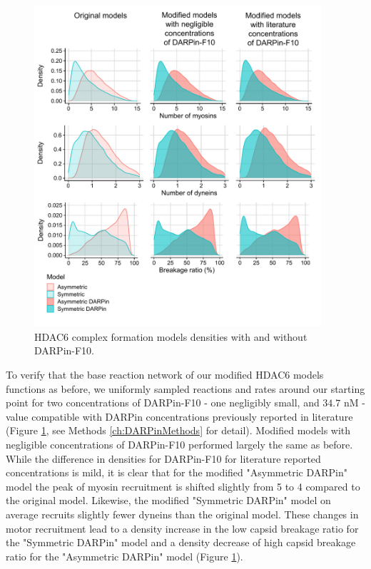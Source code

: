 \begin{figure}
\begin{center}
\includegraphics[width=0.95\textwidth, trim={0cm 0cm 0cm 0cm}, clip]{D_chapters/3_DARPinModels/Density_DARPin.pdf}
\caption[HDAC6 complex formation models densities with and without DARPin-F10]%
{HDAC6 complex formation models densities with and without DARPin-F10.}
\label{figure:darpinDensities}
\end{center}
\end{figure}

To verify that the base reaction network of our modified HDAC6 models functions as before, we uniformly sampled reactions and rates around our starting point for two concentrations of DARPin-F10 - one negligibly small, and $34.7$ nM - value compatible with DARPin concentrations previously reported in literature \cite{guillard2017structural} (Figure \ref{figure:darpinDensities}, see Methods \ref{ch:DARPinMethods} for detail). Modified models with negligible concentrations of DARPin-F10 performed largely the same as before. While the difference in densities for DARPin-F10 for literature reported concentrations is mild, it is clear that for the modified "Asymmetric DARPin" model the peak of myosin recruitment is shifted slightly from 5 to 4 compared to the original model. Likewise, the modified "Symmetric DARPin" model on average recruits slightly fewer dyneins than the original model. These changes in motor recruitment lead to a density increase in the low capsid breakage ratio for the "Symmetric DARPin" model and a density decrease of high capsid breakage ratio for the "Asymmetric DARPin" model (Figure \ref{figure:darpinDensities}).

